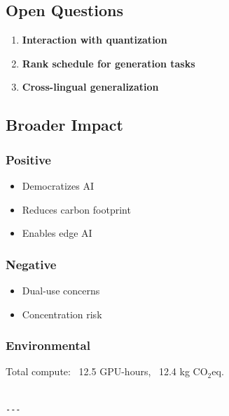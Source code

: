 \subsection{Open Questions}

\begin{enumerate}
\item \textbf{Interaction with quantization}
\item \textbf{Rank schedule for generation tasks}
\item \textbf{Cross-lingual generalization}

\end{enumerate}
\subsection{Broader Impact}

\subsubsection{Positive}
\begin{itemize}
\item Democratizes AI
\item Reduces carbon footprint
\item Enables edge AI

\end{itemize}
\subsubsection{Negative}
\begin{itemize}
\item Dual-use concerns
\item Concentration risk

\end{itemize}
\subsubsection{Environmental}
Total compute: ~12.5 GPU-hours, ~12.4 kg CO$_2$eq.
\begin{lstlisting}

---
\end{lstlisting}